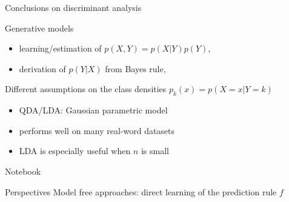 
\begin{frame}{Conclusions on discriminant analysis}
\begin{block}{Generative models}
   \begin{itemize}
      \item learning/estimation of $p(X,Y)= p(X | Y)p{(Y)}$,
      \item derivation of $p{(Y | X)}$ from Bayes rule,
   \end{itemize}
\end{block}
 \begin{block}{Different assumptions on the class densities $p_k(x)=p(X=x|Y=k)$}
      \begin{itemize}
      \item QDA/LDA: Gaussian parametric model
      \item[\doigt] performs well on many real-word datasets
      \item[\doigt] LDA is especially useful when $n$ is small
      \end{itemize}
\end{block}

\alert{Notebook}

\begin{block}{Perspectives}
   Model free approaches: direct learning of the prediction rule $f$
\end{block}



\end{frame}




